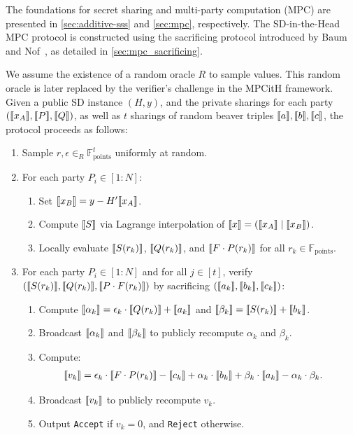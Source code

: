 \documentclass[11pt]{report}
\theoremstyle{definition}
\theoremstyle{plain}
\begin{document}
The foundations for secret sharing and multi-party computation (MPC) are presented in \autoref{sec:additive-sss} and \autoref{sec:mpc}, respectively. The SD-in-the-Head MPC protocol is constructed using the sacrificing protocol introduced by Baum and Nof~\cite{baum2020concretely}, as detailed in \autoref{sec:mpc_sacrificing}.

\begin{protocol}\label{def:sdith-mpc}
  We assume the existence of a random oracle $R$ to sample values. This random oracle is later replaced by the verifier's challenge in the MPCitH framework. Given a public SD instance $(H, y)$, and the private sharings for each party $(\llbracket x_A \rrbracket, \llbracket P \rrbracket, \llbracket Q \rrbracket)$, as well as $t$ sharings of random beaver triples $\llbracket a \rrbracket, \llbracket b \rrbracket, \llbracket c \rrbracket$, the protocol proceeds as follows:
  \begin{enumerate}
    \item Sample $r, \epsilon \in_R \mathbb{F}_{\text{points}}^t$ uniformly at random.
    \item For each party $P_i \in [1 : N]$:
          \begin{enumerate}
            \item Set $\llbracket x_B \rrbracket = y - H' \llbracket x_A \rrbracket$.
            \item Compute $\llbracket S \rrbracket$ via Lagrange interpolation of $\llbracket x \rrbracket = (\llbracket x_A \rrbracket \mid \llbracket x_B \rrbracket)$.\label{step:sdith-mpc-lagrange-interpolation}
            \item Locally evaluate $\llbracket S(r_k) \rrbracket$, $\llbracket Q(r_k) \rrbracket$, and $\llbracket F \cdot P(r_k) \rrbracket$ for all $r_k \in \mathbb{F}_{\text{points}}$.
          \end{enumerate}
    \item For each party $P_i \in [1 : N]$ and for all $j \in [t]$, verify $(\llbracket S(r_k) \rrbracket, \llbracket Q(r_k) \rrbracket, \llbracket P \cdot F(r_k) \rrbracket)$ by sacrificing $(\llbracket a_k \rrbracket, \llbracket b_k \rrbracket, \llbracket c_k \rrbracket)$:
          \begin{enumerate}
            \item Compute $\llbracket \alpha_k \rrbracket = \epsilon_k \cdot \llbracket Q(r_k) \rrbracket + \llbracket a_k \rrbracket$ and $\llbracket \beta_k \rrbracket = \llbracket S(r_k) \rrbracket + \llbracket b_k \rrbracket$.
            \item Broadcast $\llbracket \alpha_k \rrbracket$ and $\llbracket \beta_k \rrbracket$ to publicly recompute $\alpha_k$ and $\beta_k$.
            \item Compute:
                  \begin{align*}
                    \llbracket v_k \rrbracket & = \epsilon_k \cdot \llbracket F \cdot P(r_k) \rrbracket - \llbracket c_k \rrbracket + \alpha_k \cdot \llbracket b_k \rrbracket + \beta_k \cdot \llbracket a_k \rrbracket - \alpha_k \cdot \beta_k.
                  \end{align*}
            \item Broadcast $\llbracket v_k \rrbracket$ to publicly recompute $v_k$.
            \item Output \texttt{Accept} if $v_k = 0$, and \texttt{Reject} otherwise.
          \end{enumerate}
  \end{enumerate}
\end{protocol}
\end{document}
